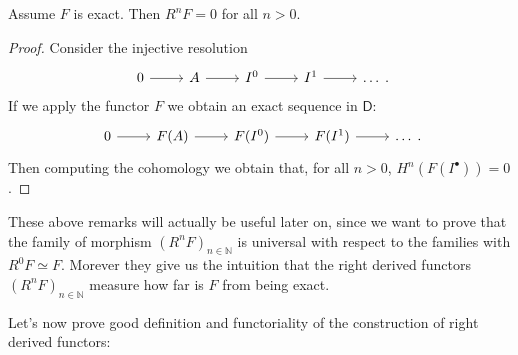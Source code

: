 \documentclass[../Main]{subfiles}
\begin{document}
\begin{rem}
	Assume $F$ is exact.
	Then $R^nF = 0$ for all $n > 0$.
\end{rem}
\begin{proof}
	Consider the injective resolution
	\begin{equation}
	\begin{tikzcd}
		0 \arrow[r, "", rightarrow] &
		A \arrow[r, "", rightarrow] &
		I^0 \arrow[r, "", rightarrow] &
		I^1 \arrow[r, "", rightarrow] &
		\ldots
	\end{tikzcd}
	.\end{equation} 
	If we apply the functor $F$ we obtain an exact sequence in $\mathsf{D}$:
	\begin{equation}
	\begin{tikzcd}
		0 \arrow[r, "", rightarrow] &
		F(A) \arrow[r, "", rightarrow] &
		F(I^0) \arrow[r, "", rightarrow] &
		F(I^1) \arrow[r, "", rightarrow] &
		\ldots
	\end{tikzcd}
	.\end{equation} 
	Then computing the cohomology we obtain that, for all $n > 0$, 
	$H^n(F(I^\bullet)) = 0$.
\end{proof}
These above remarks will actually be useful later on, since we want to prove that
the family of morphism $\left( R^nF \right)_{n \in \mathbb{N}}$ is universal with
respect to the families with $R^0 F \simeq F$.
Morever they give us the intuition that the
right derived functors $(R^nF)_{n \in \mathbb{N}}$
measure how far is $F$ from being exact.

Let's now prove good definition and functoriality of the
construction of right derived functors:
\end{document}
